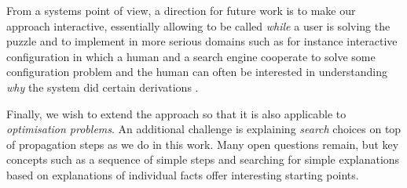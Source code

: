 From a systems point of view, a direction for future work is to make our approach interactive, essentially allowing \ourtool to be called \emph{while} a user is solving the puzzle and to implement in more serious domains such as for instance interactive configuration in which a human and a search engine cooperate to solve some configuration problem and the human can often be interested in understanding \emph{why} the system did certain derivations \cite{DBLP:journals/tplp/HertumDJD17,DBLP:conf/bnaic/CarbonnelleADVD19}. 

Finally, we wish to extend the approach so that it is also applicable to \textit{optimisation problems}. An additional challenge is explaining \textit{search} choices on top of propagation steps as we do in this work. Many open questions remain, but key concepts such as a sequence of simple steps and searching for simple explanations based on explanations of individual facts offer interesting starting points.


% 
